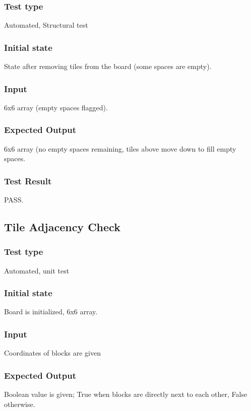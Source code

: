 \documentclass[12pt]{article}
\begin{document}
\subsubsection{Test type}
Automated, Structural test

\subsubsection{Initial state}
State after removing tiles from the board (some spaces are empty).

\subsubsection{Input}
6x6 array (empty spaces ﬂagged).

\subsubsection{Expected Output}
6x6 array (no empty spaces remaining, tiles above move down to ﬁll empty spaces.

\subsubsection{Test Result}
PASS.

\newpage

\subsection{Tile Adjacency Check}
\subsubsection{Test type}
Automated, unit test

\subsubsection{Initial state}
Board is initialized, 6x6 array.

\subsubsection{Input}
Coordinates of blocks are given

\subsubsection{Expected Output}
Boolean value is given; True when blocks are directly next to each other, False otherwise.
\end{document}
